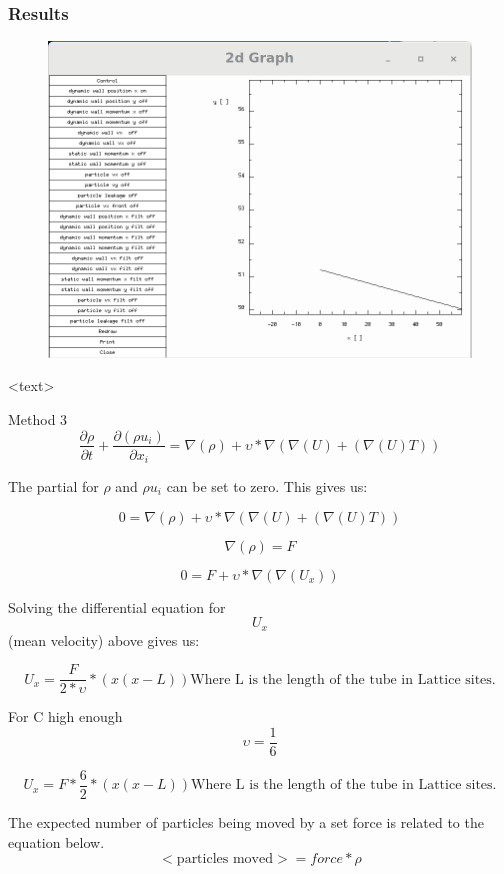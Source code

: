 \documentclass{beamer}
\begin{document}
\begin{frame}
\frametitle{Results}
\begin{figure}
\includegraphics[scale=0.2]{A11p4}
\caption{}
\end{figure}
<text>
\end{frame}

\begin{frame}{Method 3}
\begin{equation}
\frac{\partial \rho}{\partial t} + \frac{\partial(\rho u_{i})}{\partial x_{i}} = \nabla(\rho) + \upsilon *\nabla(\nabla(U)+(\nabla(U)T))
\end{equation}

The partial for $\rho$ and $\rho u_{i}$ can be set to zero.
This gives us:

\begin{equation}
0 = \nabla(\rho) + \upsilon *\nabla(\nabla(U)+(\nabla(U)T))
\end{equation}


$$ \nabla(\rho) = F$$ 

\begin{equation}
0 = F + \upsilon *\nabla(\nabla(U_x))
\end{equation}

Solving the differential equation for $$U_x$$ (mean velocity) above gives us:

\begin{equation}
U_x =\frac{F}{2*\upsilon}*(x(x-L)) \textrm{Where L is the length of the tube in Lattice sites.}
\end{equation}

For C high enough
\begin{equation}
\upsilon = \frac{1}{6}
\end{equation}

\begin{equation}
U_x =F*\frac{6}{2}*(x(x-L)) \textrm{Where L is the length of the tube in Lattice sites.}
\end{equation}

The expected number of particles being moved by a set force is related to the equation below.  
\begin{equation}
<\textrm{particles moved}> = force*\rho
\end{equation}
\end{frame}
\end{document}
